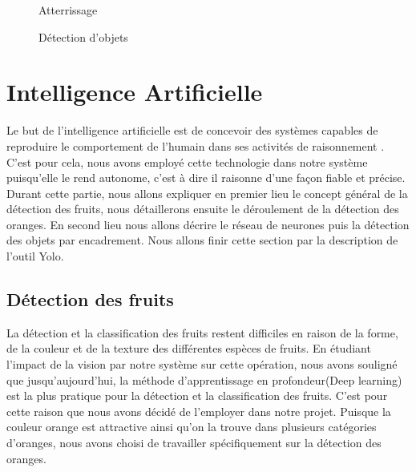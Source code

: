\begin{figure}[H]
\begin{minipage}{0.49\textwidth}
	\caption{Atterrissage }
	
\end{minipage}
\begin{minipage}{0.49\textwidth}
	\caption{Détection d'objets }
	
\end{minipage}
\end{figure}
\section{Intelligence Artificielle}
Le but de l'intelligence artificielle est de concevoir des systèmes capables de reproduire le comportement de l'humain dans ses activités de raisonnement \cite{PowerPoint}. C'est pour cela, nous avons employé cette technologie dans notre système puisqu'elle le rend autonome, c'est à dire il raisonne d'une façon fiable et précise. 
Durant cette partie, nous allons expliquer en premier lieu le concept général de la détection des fruits, nous détaillerons ensuite le déroulement de la détection des oranges. En second lieu nous allons décrire le réseau de neurones puis la détection des objets par encadrement. Nous allons finir cette section par la description de l'outil Yolo. 

\subsection{Détection des fruits}
La détection et la classification des fruits restent difficiles en raison de la forme, de la couleur et de la texture des différentes espèces de fruits. En étudiant l'impact de la vision par notre système sur cette opération, nous avons souligné que jusqu'aujourd'hui, la méthode d'apprentissage en profondeur(Deep learning) est la plus pratique pour la détection et la classification des fruits. C'est pour cette raison que nous avons décidé de l'employer dans notre projet. Puisque la couleur orange est attractive ainsi qu'on la trouve dans plusieurs catégories d'oranges, nous avons choisi de travailler spécifiquement sur la détection des oranges.
